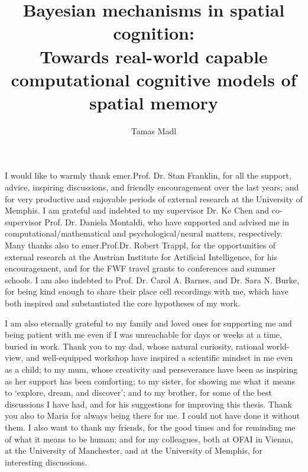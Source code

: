 \documentclass[12pt,PhD,twoside]{muthesis}
\begin{document}

\title{Bayesian mechanisms in spatial cognition:\\
Towards real-world capable computational cognitive models of spatial memory}
\author{Tamas Madl}

\beforeabstract





\afterabstract


I would like to warmly thank emer.Prof. Dr. Stan Franklin, for all the support, advice, inspiring discussions, and friendly encouragement over the last years; and for very productive and enjoyable periods of external research at the University of Memphis. I am grateful and indebted to my supervisor Dr. Ke Chen and co-supervisor Prof. Dr. Daniela Montaldi, who have supported and advised me in computational/mathematical and psychological/neural matters, respectively. Many thanks also to emer.Prof.Dr. Robert Trappl, for the opportunities of external research at the Austrian Institute for Artificial Intelligence, for his encouragement, and for the FWF travel grants to conferences and summer schools. I am also indebted to Prof. Dr. Carol A. Barnes, and Dr. Sara N. Burke, for being kind enough to share their place cell recordings with me, which have both inspired and substantiated the core hypotheses of my work. 

I am also eternally grateful to my family and loved ones for supporting me and being patient with me even if I was unreachable for days or weeks at a time, buried in work. Thank you to my dad, whose natural curiosity, rational world-view, and well-equipped workshop have inspired a scientific mindset in me even as a child; to my mum, whose creativity and perseverance have been as inspiring as her support has been comforting; to my sister, for showing me what it means to `explore, dream, and discover'; and to my brother, for some of the best discussions I have had, and for his suggestions for improving this thesis. Thank you also to Maria for always being there for me. I could not have done it without them. I also want to thank my friends, for the good times and for reminding me of what it means to be human; and for my colleagues, both at OFAI in Vienna, at the University of Manchester, and at the University of Memphis, for interesting discussions.
\end{document}
